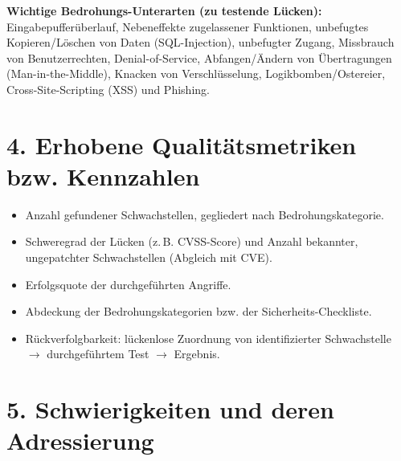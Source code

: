 \documentclass[
	fontsize=12pt,          %
	paper=a4,               %
	numbers=noenddot,       %
	listof=totoc,           %
	listof=entryprefix,     %
	listof=nochaptergap,    %
	bibliography=totoc,     %
	parskip=half,           %
	openany                 %
]{scrbook}
\begin{document}
\textbf{Wichtige Bedrohungs-Unterarten (zu testende Lücken):} Eingabepuffer\-überlauf,
Nebeneffekte zugelassener Funktionen, unbefugtes Kopieren/Löschen von Daten
(SQL-Injection), unbefugter Zugang, Missbrauch von Benutzerrechten,
Denial-of-Service, Abfangen/Ändern von Übertragungen (Man-in-the-Middle),
Knacken von Verschlüsselung, Logikbomben/Ostereier, Cross-Site-Scripting (XSS)
und Phishing.

\section*{4. Erhobene Qualitätsmetriken bzw. Kennzahlen}

\begin{itemize}
	\item Anzahl gefundener Schwachstellen, gegliedert nach Bedrohungskategorie.
	\item Schweregrad der Lücken (z.\,B. CVSS-Score) und Anzahl bekannter,
	      ungepatchter Schwachstellen (Abgleich mit CVE).
	\item Erfolgsquote der durchgeführten Angriffe.
	\item Abdeckung der Bedrohungskategorien bzw. der Sicherheits-Checkliste.
	\item Rückverfolgbarkeit: lückenlose Zuordnung von identifizierter
	      Schwachstelle $\rightarrow$ durchgeführtem Test $\rightarrow$ Ergebnis.
\end{itemize}

\section*{5. Schwierigkeiten und deren Adressierung}
\end{document}
